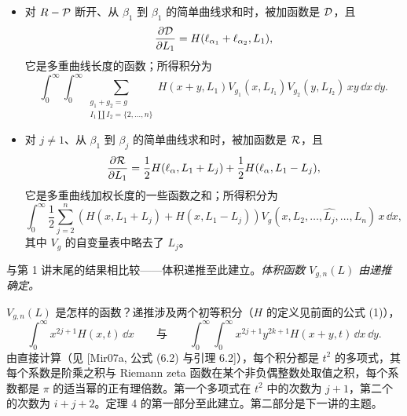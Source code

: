 \begin{itemize}[leftmargin=1.6em,itemsep=2pt,topsep=2pt]
\item 对 $R-\mathcal{P}$ 断开、从 $\beta_1$ 到 $\beta_1$ 的简单曲线求和时，被加函数是 $\mathcal{D}$，且
\[
\frac{\partial\mathcal{D}}{\partial L_1}=H(\ell_{\alpha_1}+\ell_{\alpha_2},L_1),
\]
它是多重曲线长度的函数；所得积分为
\[
\int_0^\infty\int_0^\infty\sum_{\substack{g_1+g_2=g\\ I_1\coprod I_2=\{2,\ldots,n\}}}
H(x+y,L_1)V_{g_1}(x,L_{I_1})V_{g_2}(y,L_{I_2})\,x y\,\dd x\,\dd y.
\]
\item 对 $j\neq1$、从 $\beta_1$ 到 $\beta_j$ 的简单曲线求和时，被加函数是 $\mathcal{R}$，且
\[
\frac{\partial\mathcal{R}}{\partial L_1}=\frac{1}{2}H(\ell_\alpha,L_1+L_j)+\frac{1}{2}H(\ell_\alpha,L_1-L_j),
\]
它是多重曲线加权长度的一些函数之和；所得积分为
\[
\int_0^\infty\frac{1}{2}\sum_{j=2}^n(H(x,L_1+L_j)+H(x,L_1-L_j))
V_g(x,L_2,\ldots,\widehat{L_j},\ldots,L_n)\,x\,\dd x,
\]
其中 $V_g$ 的自变量表中略去了 $L_j$。
\end{itemize}

与第 1 讲末尾的结果相比较——体积递推至此建立。\emph{体积函数 $V_{g,n}(L)$ 由递推确定。}

$V_{g,n}(L)$ 是怎样的函数？递推涉及两个初等积分（$H$ 的定义见前面的公式 (1)），
\[
\int_0^\infty x^{2j+1}H(x,t)\,\dd x\qquad\text{与}\qquad
\int_0^\infty\int_0^\infty x^{2j+1}y^{2k+1}H(x+y,t)\,\dd x\,\dd y.
\]
由直接计算（见 [Mir07a, 公式 (6.2) 与引理 6.2]），每个积分都是 $t^2$ 的多项式，其每个系数是阶乘之积与 Riemann zeta 函数在某个非负偶整数处取值之积，每个系数都是 $\pi$ 的适当幂的正有理倍数。第一个多项式在 $t^2$ 中的次数为 $j+1$，第二个的次数为 $i+j+2$。定理 4 的第一部分至此建立。第二部分是下一讲的主题。


